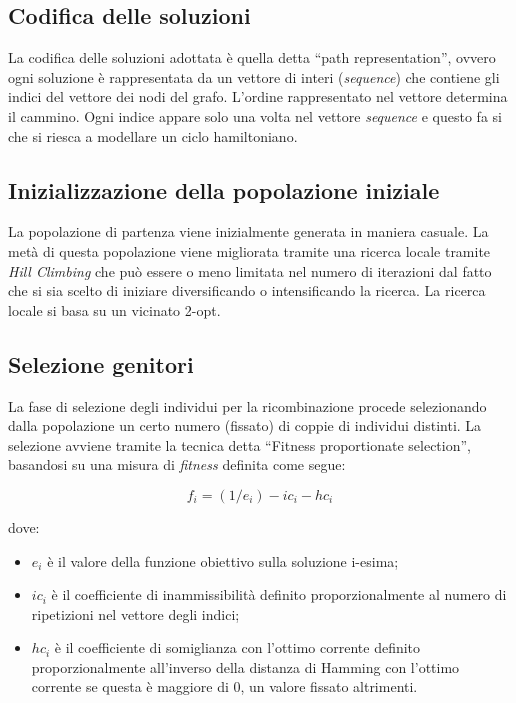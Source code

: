\documentclass[a4paper]{article}
\begin{document}
        \subsection{Codifica delle soluzioni}
            La codifica delle soluzioni adottata \`e quella detta ``path representation'', ovvero
            ogni soluzione \`e rappresentata da un vettore di interi (\emph{sequence}) che contiene
            gli indici del vettore dei nodi del grafo. L'ordine rappresentato nel vettore determina il cammino.
            Ogni indice appare solo una volta nel vettore \emph{sequence} e questo fa si che si riesca a modellare
            un ciclo hamiltoniano.

        \subsection{Inizializzazione della popolazione iniziale}
            La popolazione di partenza viene inizialmente generata in maniera casuale. La met\`a di questa popolazione
            viene migliorata tramite una ricerca locale tramite \emph{Hill Climbing} che pu\`o essere o meno limitata
            nel numero di iterazioni dal fatto che si sia scelto di iniziare diversificando o intensificando la ricerca.
            La ricerca locale si basa su un vicinato 2-opt.

        \subsection{Selezione genitori}
            La fase di selezione degli individui per la ricombinazione procede selezionando dalla popolazione un certo numero
            (fissato) di coppie di individui distinti.
            La selezione avviene tramite la tecnica detta ``Fitness proportionate selection'', basandosi su una misura di \emph{fitness}
            definita come segue:

            $$f_i = (1 / e_i) - ic_i - hc_i$$

            dove:
            \begin{itemize}
                \item $e_i$ \`e il valore della funzione obiettivo sulla soluzione i-esima;
                \item $ic_i$ \`e il coefficiente di inammissibilit\`a definito proporzionalmente
                    al numero di ripetizioni nel vettore degli indici;
                \item $hc_i$ \`e il coefficiente di somiglianza con l'ottimo corrente definito proporzionalmente
                    all'inverso della distanza di Hamming con l'ottimo corrente se questa \`e maggiore di 0, un valore
                    fissato altrimenti.
            \end{itemize}
\end{document}
